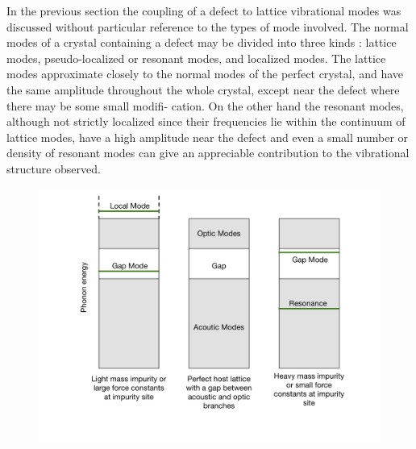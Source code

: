 In the previous section the coupling of a  defect to lattice vibrational modes was discussed without particular reference to the types of mode involved. The normal modes of a crystal containing a  defect may be  divided into three kinds : lattice modes, pseudo-localized or resonant modes, and localized modes. The lattice modes approximate closely to the normal modes of the perfect crystal, and have the same amplitude  throughout the whole crystal, except near the defect where there may be some small modifi- cation. On the other hand the resonant modes, although not strictly localized since their frequencies lie within the continuum of lattice modes, have a high amplitude near the defect and even a small number or density of resonant modes can give an appreciable contribution to the vibrational structure observed. 

\begin{figure}[h!]   
\centering
  \includegraphics[width=0.6\columnwidth]{figures/ch6/defect_modes_schematic.png}
  \caption[The three kinds of mode found in a crystal with a defect]{}
\label{defect_modes_schematic}
\end{figure}

